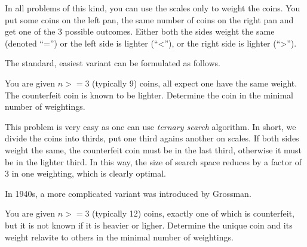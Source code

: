 In all problems of this kind, you can use the scales only to weight the coins.
You put some coins on the left pan, the same number of coins on the right pan
  and get one of the 3 possible outcomes.
Either both the sides weight the same (denoted ``='')
  or the left side is lighter (``<''),
  or the right side is lighter (``>'').

The standard, easiest variant can be formulated as follows.

\begin{problem} \label{pr:coins9}
You are given $n >= 3$ (typically 9) coins, all expect one have the same weight.
The counterfeit coin is known to be lighter.
Determine the coin in the minimal number of weightings.
\end{problem}

This problem is very easy as one can use \emph{ternary search} algorithm.
In short, we divide the coins into thirds, put one third agains another
  on scales.
If both sides weight the same, the counterfeit coin must be in the last third,
  otherwise it must be in the lighter third.
In this way, the size of search space reduces by a factor of 3 in one weighting,
  which is clearly optimal.

In 1940s, a more complicated variant was introduced by Grossman\cite{coins-grossman1945}.

\begin{problem} \label{pr:coins12}
You are given $n >= 3$ (typically 12) coins, exactly one of which is counterfeit,
  but it is not known if it is heavier or ligher.
Determine the unique coin and its weight relavite to others
  in the minimal number of weightings.
\end{problem}


